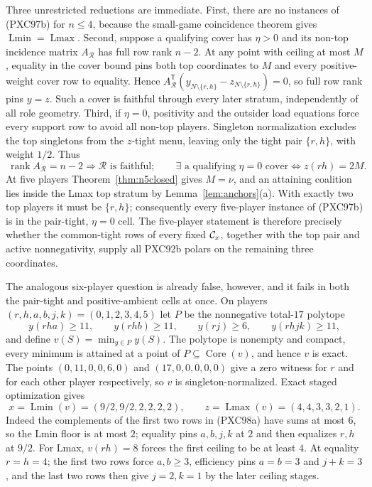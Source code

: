 \documentclass[11pt]{article}
\newcommand{\core}{\operatorname{Core}}
\newcommand{\Lmin}{\operatorname{Lmin}}
\newcommand{\Lmax}{\operatorname{Lmax}}
\begin{document}
Three unrestricted reductions are immediate.  First, there are no instances
of (PXC97b) for $n\le4$, because the small-game coincidence theorem gives
$\Lmin=\Lmax$.  Second, suppose a qualifying cover has $\eta>0$ and its
non-top incidence matrix $A_{\mathcal R}$ has full row rank $n-2$.  At any
point with ceiling at most $M$, equality in the cover bound pins both top
coordinates to $M$ and every positive-weight cover row to equality.  Hence
$A_{\mathcal R}^{\mathsf T}(y_{N\setminus\{r,h\}}-
z_{N\setminus\{r,h\}})=0$, so full row rank pins $y=z$.  Such a cover is
faithful through every later stratum, independently of all role geometry.
Third, if $\eta=0$, positivity and the outsider load equations force every
support row to avoid all non-top players.  Singleton normalization excludes
the top singletons from the $z$-tight menu, leaving only the tight pair
$\{r,h\}$, with weight $1/2$.  Thus
\[
 \boxed{\ \operatorname{rank}A_{\mathcal R}=n-2
         \Longrightarrow \mathcal R\text{ is faithful};\qquad
         \exists\text{ a qualifying }\eta=0\text{ cover}
         \Longleftrightarrow z(rh)=2M.\ }             \tag{PXC97c}
\]
At five players Theorem~\ref{thm:n5closed} gives $M=\nu$, and an attaining
coalition lies inside the Lmax top stratum by
Lemma~\ref{lem:anchors}(a).  With exactly two top players it must be
$\{r,h\}$; consequently every five-player instance of (PXC97b) is in the
pair-tight, $\eta=0$ cell.  The five-player statement is therefore precisely
whether the common-tight rows of every fixed ${\cal C}_x$, together with the
top pair and active nonnegativity, supply all PXC92b polars on the remaining
three coordinates.

The analogous six-player question is already false, however, and it fails in
both the pair-tight and positive-ambient cells at once.  On players
$(r,h,a,b,j,k)=(0,1,2,3,4,5)$ let $P$ be the nonnegative total-$17$
polytope
\[
 y(rha)\ge11,\qquad y(rhb)\ge11,\qquad
 y(rj)\ge6,\qquad y(rhjk)\ge11,                 \tag{PXC98a}
\]
and define $v(S)=\min_{y\in P}y(S)$.  The polytope is nonempty and compact,
every minimum is attained at a point of $P\subseteq\core(v)$, and hence $v$
is exact.  The points $(0,11,0,0,6,0)$ and $(17,0,0,0,0,0)$ give a zero
witness for $r$ and for each other player respectively, so $v$ is
singleton-normalized.  Exact staged optimization gives
\[
 x=\Lmin(v)=(9/2,9/2,2,2,2,2),\qquad
 z=\Lmax(v)=(4,4,3,3,2,1).                     \tag{PXC98b}
\]
Indeed the complements of the first two rows in (PXC98a) have sums at most
$6$, so the Lmin floor is at most $2$; equality pins $a,b,j,k$ at $2$ and
then equalizes $r,h$ at $9/2$.  For Lmax, $v(rh)=8$ forces the first ceiling
to be at least $4$.  At equality $r=h=4$; the first two rows force
$a,b\ge3$, efficiency pins $a=b=3$ and $j+k=3$, and the last two rows then
give $j=2,k=1$ by the later ceiling stages.
\end{document}
